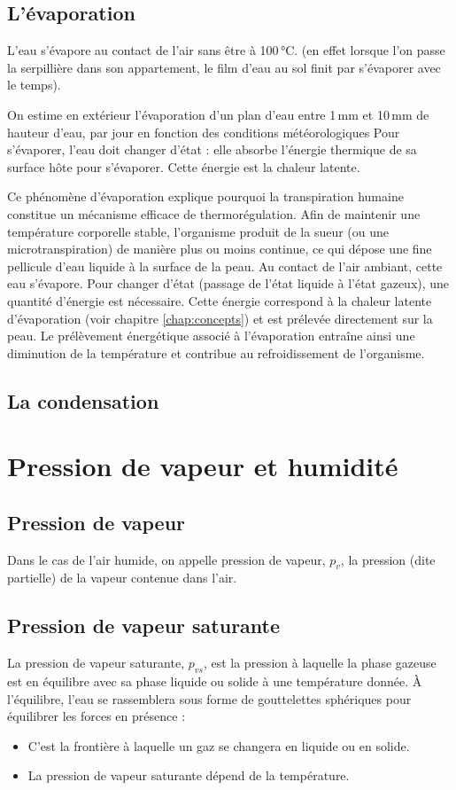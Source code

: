 \subsection*{L'évaporation}
L'eau s'évapore au contact de l'air sans être à 100\,°C. (en effet lorsque l'on passe la serpillière dans son appartement, le film d'eau au sol finit par s'évaporer avec le temps).

On estime en extérieur l'évaporation d'un plan d'eau entre 1\,mm et 10\,mm de hauteur d'eau, par jour en fonction des conditions météorologiques 
Pour s'évaporer, l'eau doit changer d'état : elle absorbe l'énergie thermique de sa surface hôte pour s'évaporer. Cette énergie est la chaleur latente.

Ce phénomène d’évaporation explique pourquoi la transpiration humaine constitue un mécanisme efficace de thermorégulation. Afin de maintenir une température corporelle stable, l’organisme produit de la sueur (ou une microtranspiration) de manière plus ou moins continue, ce qui dépose une fine pellicule d’eau liquide à la surface de la peau. Au contact de l’air ambiant, cette eau s’évapore. Pour changer d’état (passage de l’état liquide à l’état gazeux), une quantité d’énergie est nécessaire. Cette énergie correspond à la chaleur latente d’évaporation (voir chapitre \ref{chap:concepts}) et est prélevée directement sur la peau. Le prélèvement énergétique associé à l’évaporation entraîne ainsi une diminution de la température et contribue au refroidissement de l’organisme.


\subsection*{La condensation}

\section{Pression de vapeur et humidité}

\subsection*{Pression de vapeur}
Dans le cas de l'air humide, on appelle pression de vapeur, $p_v$, la pression (dite partielle) de la vapeur contenue dans l'air.

\subsection*{Pression de vapeur saturante}
La pression de vapeur saturante, $p_{vs}$, est la pression à laquelle la phase gazeuse est en équilibre avec sa phase liquide ou solide à une température donnée. À l'équilibre, l'eau se rassemblera sous forme de gouttelettes sphériques pour équilibrer les forces en présence :
\begin{itemize}
  \item C'est la frontière à laquelle un gaz se changera en liquide ou en solide.
  \item La pression de vapeur saturante dépend de la température.
\end{itemize}

